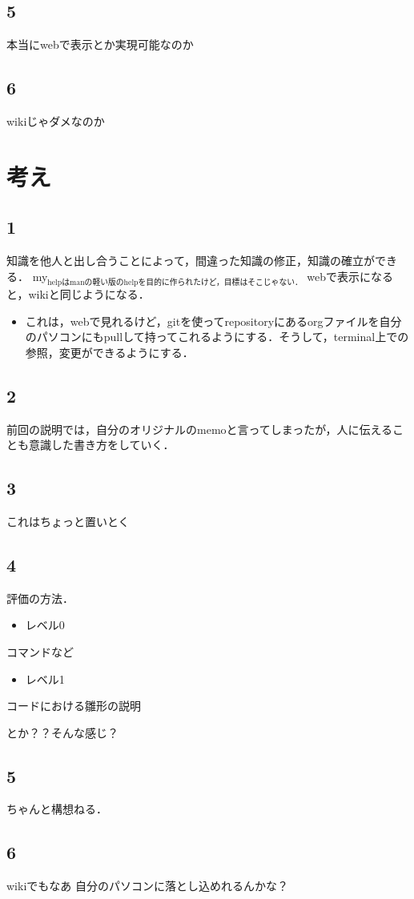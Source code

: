 \documentclass[11pt]{article}
\begin{document}
\subsection{5}
\label{sec-2-5}
本当にwebで表示とか実現可能なのか
\subsection{6}
\label{sec-2-6}
wikiじゃダメなのか

\section{考え}
\label{sec-3}
\subsection{1}
\label{sec-3-1}
知識を他人と出し合うことによって，間違った知識の修正，知識の確立ができる．
my$_{\text{helpはmanの軽い版のhelpを目的に作られたけど，目標はそこじゃない．}}$
webで表示になると，wikiと同じようになる．
\begin{itemize}
\item これは，webで見れるけど，gitを使ってrepositoryにあるorgファイルを自分のパソコンにもpullして持ってこれるようにする．そうして，terminal上での参照，変更ができるようにする．
\end{itemize}

\subsection{2}
\label{sec-3-2}
前回の説明では，自分のオリジナルのmemoと言ってしまったが，人に伝えることも意識した書き方をしていく．

\subsection{3}
\label{sec-3-3}
これはちょっと置いとく

\subsection{4}
\label{sec-3-4}
評価の方法．
\begin{itemize}
\item レベル0
\end{itemize}
コマンドなど

\begin{itemize}
\item レベル1
\end{itemize}
コードにおける雛形の説明

とか？？そんな感じ？

\subsection{5}
\label{sec-3-5}
ちゃんと構想ねる．

\subsection{6}
\label{sec-3-6}
wikiでもなあ
自分のパソコンに落とし込めれるんかな？
\end{document}
